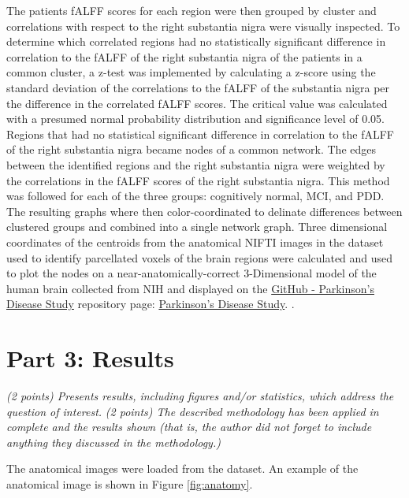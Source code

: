 \documentclass[12pt]{article}
\begin{document}
The patients fALFF scores for each region were then grouped by cluster and correlations with respect to the right substantia nigra were visually inspected. To determine which correlated regions had no statistically significant difference in correlation to the fALFF of the right substantia nigra of the patients in a common cluster, a z-test was implemented by calculating a z-score using the standard deviation of the correlations to the fALFF of the substantia nigra per the difference in the correlated fALFF scores. The critical value was calculated with a presumed normal probability distribution and significance level of 0.05. Regions that had no statistical significant difference in correlation to the fALFF of the right substantia nigra became nodes of a common network. The edges between the identified regions and the right substantia nigra were weighted by the correlations in the fALFF scores of the right substantia nigra. This method was followed for each of the three groups: cognitively normal, MCI, and PDD. The resulting graphs where then color-coordinated to delinate differences between clustered groups and combined into a single network graph. Three dimensional coordinates of the centroids from the anatomical NIFTI images in the dataset used to identify parcellated voxels of the brain regions were calculated and used to plot the nodes on a near-anatomically-correct 3-Dimensional model of the human brain collected from NIH \cite{NIH3DPX021161} and displayed on the \href{https://github.com/efwoods/Parkinson_Disease_Study}{GitHub - Parkinson's Disease Study} repository page: \href{https://efwoods.github.io/Parkinsons_Disease_Study/}{Parkinson's Disease Study}. \cite{WoodsParkinsonsStudy}.

\section{Part 3: Results}
\textit{(2 points) Presents results, including figures and/or statistics, which address the question of interest.}
\textit{(2 points) The described methodology has been applied in complete and the results shown (that is, the author did not forget to include anything they discussed in the methodology.) }

The anatomical images were loaded from the dataset. An example of the anatomical image is shown in Figure \ref{fig:anatomy}.
\end{document}
